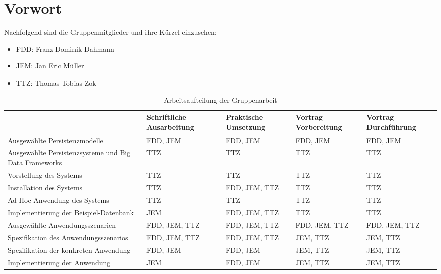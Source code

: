 \chapter{Vorwort}
Nachfolgend sind die Gruppenmitglieder und ihre K\"urzel einzusehen:
\begin{itemize}
\item FDD:    Franz-Dominik Dahmann
\item JEM:    Jan Eric M\"uller
\item TTZ:    Thomas Tobias Zok
\end{itemize}

\begin{table*}[h]
\caption{Arbeitsaufteilung der Gruppenarbeit}
\centering
\begin{tabular}{|p{4cm}|p{2cm}|p{2cm}|p{2cm}|p{2cm}|}
\hline 
	 & Schriftliche Ausarbeitung & Praktische Umsetzung & Vortrag Vorbereitung & Vortrag Durchführung \\ 
\hline 
Ausgewählte Persistenzmodelle & FDD, JEM & FDD, JEM & FDD, JEM & FDD, JEM \\ 
\hline 
Ausgewählte Persistenzsysteme und Big Data Frameworks & TTZ & TTZ & TTZ & TTZ \\ 
\hline 
Vorstellung des Systems & TTZ & TTZ & TTZ & TTZ \\ 
\hline 
Installation des Systems & TTZ & FDD, JEM, TTZ & TTZ & TTZ \\ 
\hline 
Ad-Hoc-Anwendung des Systems & TTZ & TTZ & TTZ & TTZ \\ 
\hline 
Implementierung der Beispiel-Datenbank & JEM & FDD, JEM, TTZ & TTZ & TTZ \\ 
\hline 
Ausgewählte Anwendungsszenarien & FDD, JEM, TTZ & FDD, JEM, TTZ & FDD, JEM, TTZ & FDD, JEM, TTZ \\ 
\hline 
Spezifikation des Anwendungsszenarios & FDD, JEM, TTZ & FDD, JEM, TTZ & JEM, TTZ & JEM, TTZ \\ 
\hline 
Spezifikation der konkreten Anwendung & FDD, JEM & FDD, JEM & JEM, TTZ & JEM, TTZ \\ 
\hline 
Implementierung der Anwendung & JEM & FDD, JEM & JEM, TTZ & JEM, TTZ \\ 
\hline 
\end{tabular} 
\end{table*}